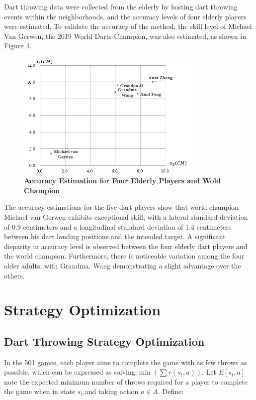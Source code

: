 \documentclass[cjjs]{ipart}
\theoremstyle{plain}
\begin{document}
Dart throwing data were collected from the elderly by hosting dart throwing events within the neighborhoods, and the accuracy levels of four elderly players were estimated. To validate the accuracy of the method, the skill level of Michael Van Gerwen, the 2019 World Darts Champion, was also estimated, as shown in Figure 4.

\begin{figure}[h]
    \centering
    \includegraphics[width=0.80\textwidth]{4.png} 
    \caption{\textbf{Accuracy Estimation for Four Elderly Players and Wold Champion}}
    \label{fig:dartboard}
\end{figure}

The accuracy estimations for the five dart players show that world champion Michael van Gerwen exhibits exceptional skill, with a lateral standard deviation of 0.9 centimeters and a longitudinal standard deviation of 1.4 centimeters between his dart landing positions and the intended target.  A significant disparity in accuracy level is observed between the four elderly dart players and the world champion.  Furthermore, there is noticeable variation among the four older adults, with Grandma. Wang demonstrating a slight advantage over the others.

\section{Strategy Optimization}
\subsection{Dart Throwing Strategy Optimization}
In the 501 games, each player aims to complete the game with as few throws as possible, which can be expressed as solving:$\min \left( \sum r(s_t, a) \right)$. Let $E[s_t, a]$ note the expected minimum number of throws required for a player to complete the game when in state $s_t$,and taking action $a \in A$. Define:
\end{document}
